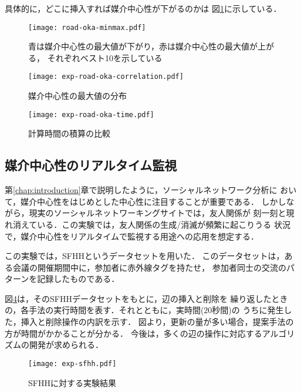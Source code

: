 具体的に，どこに挿入すれば媒介中心性が下がるのかは
図\ref{fig:road-okayama-minmax}に示している．

\begin{figure}[tb]
  \centering
  \texttt{[image: road-oka-minmax.pdf]}
  \caption{青は媒介中心性の最大値が下がり，赤は媒介中心性の最大値が上がる，
  それぞれベスト10を示している}
  \label{fig:road-okayama-minmax}
\end{figure}

\begin{figure}[tb]
  \centering
  \texttt{[image: exp-road-oka-correlation.pdf]}
  \caption{媒介中心性の最大値の分布}
  \label{fig:exp-road-oka-correlation}
\end{figure}

\begin{figure}[tb]
  \centering
  \texttt{[image: exp-road-oka-time.pdf]}
  \caption{計算時間の積算の比較}
  \label{fig:exp-road-oka-time}
\end{figure}

\subsection{媒介中心性のリアルタイム監視}
\label{subsect:exp-sfhh}

第\ref{chap:introduction}章で説明したように，ソーシャルネットワーク分析に
おいて，媒介中心性をはじめとした中心性に注目することが重要である．
しかしながら，現実のソーシャルネットワーキングサイトでは，友人関係が
刻一刻と現れ消えている．この実験では，友人関係の生成/消滅が頻繁に起こりうる
状況で，媒介中心性をリアルタイムで監視する用途への応用を想定する．

この実験では，SFHH\cite{Genois2018}というデータセットを用いた．
このデータセットは，ある会議の開催期間中に，参加者に赤外線タグを持たせ，
参加者同士の交流のパターンを記録したものである．

図\ref{fig:exp-sfhh}は，そのSFHHデータセットをもとに，辺の挿入と削除を
繰り返したときの，各手法の実行時間を表す．それとともに，実時間($20$秒間)の
うちに発生した，挿入と削除操作の内訳を示す．
図より，更新の量が多い場合，提案手法の方が時間がかかることが分かる．
今後は，多くの辺の操作に対応するアルゴリズムの開発が求められる．

\begin{figure}[tb]
  \centering
  \texttt{[image: exp-sfhh.pdf]}
  \caption{SFHHに対する実験結果}
  \label{fig:exp-sfhh}
\end{figure}
